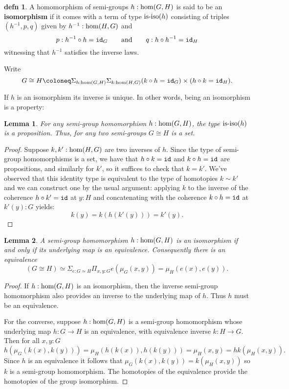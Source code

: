 \documentclass{amsart}
\theoremstyle{theorem}
\newtheorem*{lem}{Lemma}
\theoremstyle{definition}
\newtheorem*{defn}{defn}
\theoremstyle{remark}
\newcommand{\0}{\mathbbe{0}}
\newcommand{\1}{\mathbbe{1}}
\newcommand{\2}{\mathbbe{2}}
\newcommand{\3}{\mathbbe{3}}
\newcommand{\4}{\mathbbe{4}}
\newcommand{\term}[1]{{\textup{\texttt{#1}}}}
\newcommand{\type}[1]{{\textup{#1}}}
\newcommand{\id}{\term{id}}
\newcommand{\is}[1]{\type{is-{#1}}}
\begin{document}
\begin{defn}A  homomorphism of semi-groups $h : \type{hom}(G,H)$ is said to be an \textbf{isomorphism} if it comes with a term of type $\is{iso}(h)$ consisting of triples $(h^{-1},p,q)$ given by $h^{-1} : \type{hom}(H,G)$ and
\[ p : h^{-1} \circ h = \id_G \qquad \text{and} \qquad q : h \circ h^{-1} = \id_H\]
witnessing that $h^{-1}$ satisfies the inverse laws.
\end{defn}

Write \[G \cong H \coloneq \Sigma_{h: \type{hom}(G,H)} \Sigma_{k: \type{hom}(H,G)} (k \circ h = \id_G) \times (h \circ k = \id_H).\]

If $h$ is an isomorphism its inverse is unique. In other words, being an isomorphism is a property:

\begin{lem} For any semi-group homomorphism $h : \type{hom}(G,H)$, the type $\is{iso}(h)$ is a proposition. Thus, for any two semi-groups $G \cong H$ is a set.
\end{lem}
\begin{proof}
Suppose $k, k' : \type{hom}(H,G)$ are two inverses of $h$. Since the type of semi-group homomorphisms is a set, we have that $h \circ k = \id$ and $k \circ h = \id$ are propositions, and similarly for $k'$, so it suffices to check that $k = k'$. We've observed that this identity type is equivalent to the type of homotopies $k \sim k'$ and we can construct one by the usual argument: applying $k$ to the inverse of the coherence $h \circ k' = \id$ at $y : H$ and concatenating with the coherence $k \circ h = \id$ at $k'(y) : G$ yields:
\[ k(y) = k(h(k'(y))) = k'(y).\]
\end{proof}

\begin{lem} A semi-group homomorphism $h : \type{hom}(G,H)$ is an isomorphism if and only if its underlying map is an equivalence. Consequently there is an equivalence 
\[ (G \cong H ) \simeq \Sigma_{e: G \simeq H} \Pi_{x,y: G} e(\mu_G(x,y)) = \mu_H(e(x),e(y)).\]
\end{lem}
\begin{proof}
If $h : \type{hom}(G,H)$ is an isomorphism, then the inverse semi-group homomorphism also provides an inverse to the underlying map of $h$. Thus $h$ must be an equivalence.

For the converse, suppose $h : \type{hom}(G,H)$ is a semi-group homomorphism whose underlying map $h : G \to H$ is an equivalence, with equivalence inverse $k : H \to G$. Then for all $x,y : G$
\[ h( \mu_G(k(x), k(y))) = \mu_H (h(k(x)), h(k(y))) = \mu_H(x,y) = hk(\mu_H(x,y)).\]
Since $h$ is an equivalence it follows that $\mu_G(k(x),k(y)) = k(\mu_H(x,y))$ so $k$ is a semi-group homomorphism. The homotopies of the equivalence provide the homotopies of the group isomorphism.
\end{proof}
\end{document}
